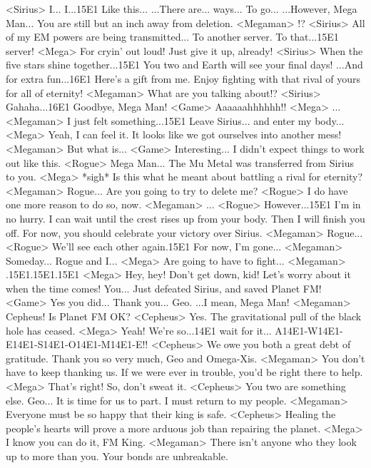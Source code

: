 <Sirius> I... I...{15}{E1} Like this... 
...There are... ways... To go... 
...However, Mega Man... 
You are still but an inch away from deletion. 
<Megaman> !? 
<Sirius> All of my EM powers are being transmitted... 
To another server. 
To that...{15}{E1} server! 
<Mega> For cryin' out loud! Just give it up, already! 
<Sirius> When the five stars shine together...{15}{E1} 
You two and Earth will see your final days! 
...And for extra fun...{16}{E1} 
Here's a gift from me. 
Enjoy fighting with that rival of yours for all of eternity! 
<Megaman> What are you talking about!? 
<Sirius> Gahaha...{16}{E1} Goodbye, Mega Man! 
<Game> Aaaaaahhhhhh!! 
<Mega> ... 
<Megaman> I just felt something...{15}{E1} Leave Sirius... and enter my body... 
<Mega> Yeah, I can feel it. 
It looks like we got ourselves into another mess! 
<Megaman> But what is... 
<Game> Interesting... I didn't expect things to work out like this. 
<Rogue> Mega Man... 
The Mu Metal was transferred from Sirius to you. 
<Mega> *sigh* 
Is this what he meant about battling a rival for eternity? 
<Megaman> Rogue... Are you going to try to delete me? 
<Rogue> I do have one more reason to do so, now. 
<Megaman> ... 
<Rogue> However...{15}{E1} I'm in no hurry. 
I can wait until the crest rises up from your body. 
Then I will finish you off. 
For now, you should celebrate your victory over Sirius. 
<Megaman> Rogue... 
<Rogue> We'll see each other again.{15}{E1} For now, I'm gone... 
<Megaman> Someday... Rogue and I... 
<Mega> Are going to have to fight... 
<Megaman> .{15}{E1}.{15}{E1}.{15}{E1} 
<Mega> Hey, hey! Don't get down, kid! 
Let's worry about it when the time comes! 
You... Just defeated Sirius, and saved Planet FM! 
<Game> Yes you did... 
Thank you... Geo. ...I mean, Mega Man! 
<Megaman> Cepheus! 
Is Planet FM OK? 
<Cepheus> Yes. The gravitational pull of the black hole has ceased. 
<Mega> Yeah! We're so...{14}{E1} wait for it... A{14}{E1}-W{14}{E1}-E{14}{E1}-S{14}{E1}-O{14}{E1}-M{14}{E1}-E!! 
<Cepheus> We owe you both a great debt of gratitude. 
Thank you so very much, Geo and Omega-Xis. 
<Megaman> You don't have to keep thanking us. 
If we were ever in trouble, you'd be right there to help. 
<Mega> That's right! So, don't sweat it. 
<Cepheus> You two are something else. 
Geo... It is time for us to part. 
I must return to my people. 
<Megaman> Everyone must be so happy that their king is safe. 
<Cepheus> Healing the people's hearts will prove a more arduous job than repairing the planet. 
<Mega> I know you can do it, FM King. 
<Megaman> There isn't anyone who they look up to more than you. Your bonds are unbreakable. 
